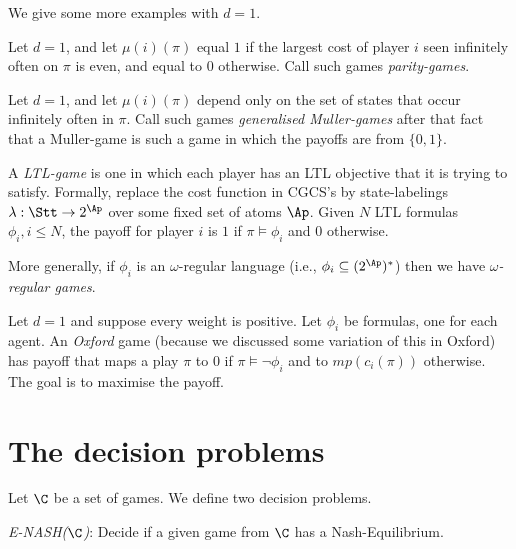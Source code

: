 We give some more examples with $d = 1$.


\begin{example}
Let $d = 1$, and let $\mu(i)(\pi)$ equal $1$ if the largest cost of player $i$ seen infinitely often on $\pi$ is even, and equal to $0$ otherwise. 
Call such games {\em parity-games}. 
\end{example}

\begin{example}
 Let $d = 1$, and let $\mu(i)(\pi)$ depend only on the set of states that occur infinitely often in $\pi$. Call such games {\em generalised Muller-games} after that fact
 that a Muller-game is such a game in which the payoffs are from $\{0,1\}$.
\end{example}

\begin{example}
A \emph{LTL-game} is one in which each player has an LTL objective that it is trying to satisfy. 
Formally, replace the cost function in CGCS's by state-labelings $\lambda:\Stt \to 2^{\Ap}$ over some fixed set of atoms $\Ap$.
Given $N$ LTL formulas $\phi_i, i \leq N$, the payoff for player $i$ is $1$ if $\pi \models \phi_i$ and $0$ otherwise.

More generally, if $\phi_i$ is an $\omega$-regular language (i.e., $\phi_i \subseteq (2^{\Ap})^*$) then we have \emph{$\omega$-regular games}.
\end{example}

\begin{example}
Let $d = 1$ and suppose every weight is positive. Let $\phi_i$ be \LTL formulas, one for each agent. 
An \emph{Oxford} game (because we discussed some variation of this in Oxford)
has payoff that maps a play $\pi$ to $0$ if $\pi \models \neg \phi_i$ and to $mp(c_i(\pi))$ otherwise. The goal is to maximise the payoff.
\end{example}


\section{The decision problems}

Let $\C$ be a set of games. We define two decision problems.
\begin{definition}
 \emph{E-NASH($\C$)}: Decide if a given game from $\C$ has a Nash-Equilibrium.
\end{definition}

